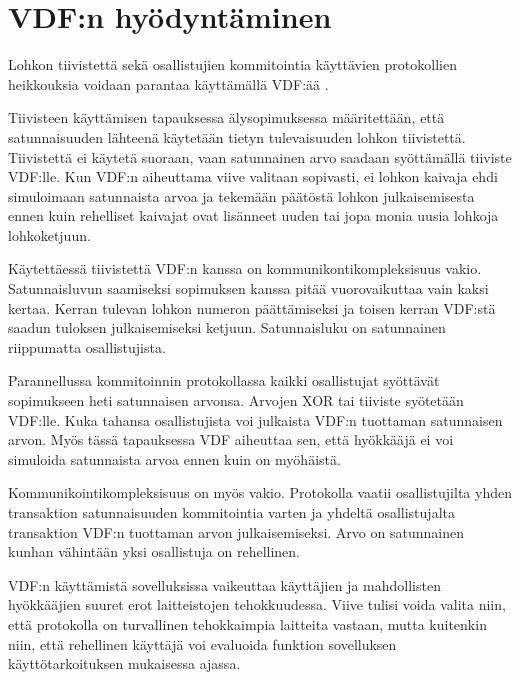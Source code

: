 \section{VDF:n hyödyntäminen}

Lohkon tiivistettä sekä osallistujien kommitointia käyttävien protokollien heikkouksia voidaan parantaa käyttämällä VDF:ää \cite{boneh_verifiable_2018}. 

Tiivisteen käyttämisen tapauksessa älysopimuksessa määritettään, että satunnaisuuden lähteenä käytetään tietyn tulevaisuuden lohkon tiivistettä. Tiivistettä ei käytetä suoraan, vaan satunnainen arvo saadaan syöttämällä tiiviste VDF:lle. Kun VDF:n aiheuttama viive valitaan sopivasti, ei lohkon kaivaja ehdi simuloimaan satunnaista arvoa ja tekemään päätöstä lohkon julkaisemisesta ennen kuin rehelliset kaivajat ovat lisänneet uuden tai jopa monia uusia lohkoja lohkoketjuun.

Käytettäessä tiivistettä VDF:n kanssa on kommunikontikompleksisuus vakio. Satunnaisluvun saamiseksi sopimuksen kanssa pitää vuorovaikuttaa vain kaksi kertaa. Kerran tulevan lohkon numeron päättämiseksi ja toisen kerran VDF:stä saadun tuloksen julkaisemiseksi ketjuun. Satunnaisluku on satunnainen riippumatta osallistujista.

Parannellussa kommitoinnin protokollassa kaikki osallistujat syöttävät sopimukseen heti satunnaisen arvonsa. Arvojen XOR tai tiiviste syötetään VDF:lle. Kuka tahansa osallistujista voi julkaista VDF:n tuottaman satunnaisen arvon. Myös tässä tapauksessa VDF aiheuttaa sen, että hyökkääjä ei voi simuloida satunnaista arvoa ennen kuin on myöhäistä. 

Kommunikointikompleksisuus on myös vakio. Protokolla vaatii osallistujilta yhden transaktion satunnaisuuden kommitointia varten ja yhdeltä osallistujalta transaktion VDF:n tuottaman arvon julkaisemiseksi. Arvo on satunnainen kunhan vähintään yksi osallistuja on rehellinen.

VDF:n käyttämistä sovelluksissa vaikeuttaa käyttäjien ja mahdollisten hyökkääjien suuret erot laitteistojen tehokkuudessa. Viive tulisi voida valita niin, että protokolla on turvallinen tehokkaimpia laitteita vastaan, mutta kuitenkin niin, että rehellinen käyttäjä voi evaluoida funktion sovelluksen käyttötarkoituksen mukaisessa ajassa.

